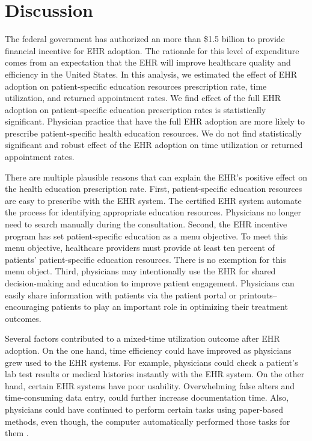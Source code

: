 \documentclass[12pt]{report}
\begin{document}
\chapter{Discussion}

\label{chapter:discussion}
The federal government has authorized an more than \$1.5 billion to provide financial incentive for EHR adoption. The rationale for this level of expenditure comes from an expectation that the EHR will improve healthcare quality and efficiency in the United States. In this analysis, we estimated the effect of EHR adoption on patient-specific education resources prescription rate, time utilization, and returned appointment rates. We find effect of the full EHR adoption on patient-specific education prescription rates is statistically significant. Physician practice that have the full EHR adoption are more likely to prescribe patient-specific health education resources. We do not find statistically significant and robust effect of the EHR adoption on time utilization or returned appointment rates.

There are multiple plausible reasons that can explain the EHR's positive effect on the health education prescription rate. First, patient-specific education resources are easy to prescribe with the EHR system. The certified EHR system automate the process for identifying appropriate education resources. Physicians no longer need to search manually during the consultation. Second, the EHR incentive program has set patient-specific education as a menu objective. To meet this menu objective, healthcare providers must provide at least ten percent of patients' patient-specific education resources. There is no exemption for this menu object. Third, physicians may intentionally use the EHR for shared decision-making and education to improve patient engagement. Physicians can easily share information with patients via the patient portal or printouts--encouraging patients to play an important role in optimizing their treatment outcomes.

Several factors contributed to a mixed-time utilization outcome after EHR adoption. On the one hand, time efficiency could have improved as physicians grew used to the EHR systems. For example, physicians could check a patient's lab test results or medical histories instantly with the EHR system. On the other hand, certain EHR systems have poor usability. Overwhelming false alters and time-consuming data entry, could further increase documentation time. Also, physicians could have continued to perform certain tasks using paper-based methods, even though, the computer automatically performed those tasks for them \citep{overhage2001controlled}. 
\end{document}
